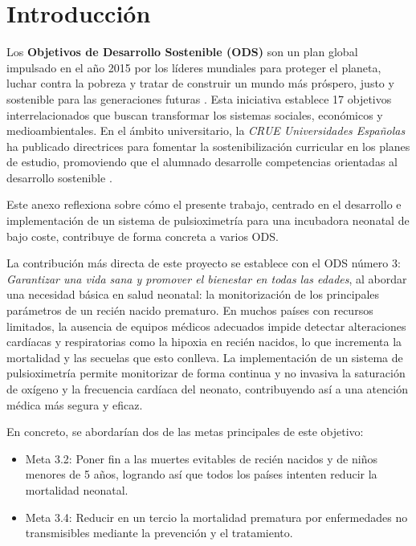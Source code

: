 
\section{Introducción}

Los \textbf{Objetivos de Desarrollo Sostenible (ODS)} son un plan global impulsado en el año 2015 por los líderes mundiales para proteger el planeta, luchar contra la pobreza y tratar de construir un mundo más próspero, justo y sostenible para las generaciones futuras \cite{onu:ods}. Esta iniciativa establece 17 objetivos interrelacionados que buscan transformar los sistemas sociales, económicos y medioambientales. En el ámbito universitario, la \textit{CRUE Universidades Españolas} ha publicado directrices para fomentar la sostenibilización curricular en los planes de estudio, promoviendo que el alumnado desarrolle competencias orientadas al desarrollo sostenible \cite{crue:sostenibilidad}.

Este anexo reflexiona sobre cómo el presente trabajo, centrado en el desarrollo e implementación de un sistema de pulsioximetría para una incubadora neonatal de bajo coste, contribuye de forma concreta a varios ODS. 


La contribución más directa de este proyecto se establece con el ODS número 3: \textit{Garantizar una vida sana y promover el bienestar en todas las edades}, al abordar una necesidad básica en salud neonatal: la monitorización de los principales parámetros de un recién nacido prematuro. En muchos países con recursos limitados, la ausencia de equipos médicos adecuados impide detectar alteraciones cardíacas y respiratorias como la hipoxia en recién nacidos, lo que incrementa la mortalidad y las secuelas que esto conlleva. La implementación de un sistema de pulsioximetría permite monitorizar de forma continua y no invasiva la saturación de oxígeno y la frecuencia cardíaca del neonato, contribuyendo así a una atención médica más segura y eficaz.

En concreto, se abordarían dos de las metas principales de este objetivo: 
\begin{itemize}
    \item Meta 3.2: Poner fin a las muertes evitables de recién nacidos y de niños menores de 5 años, logrando así que todos los países intenten reducir la mortalidad neonatal.\cite{onu:ods}
    \item Meta 3.4: Reducir en un tercio la mortalidad prematura por enfermedades no transmisibles mediante la prevención y el tratamiento.
\end{itemize}

